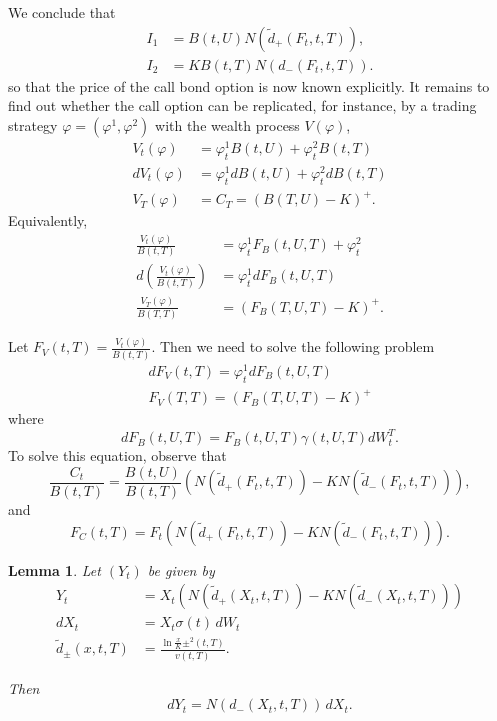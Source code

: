 \documentclass[10pt, oneside, reqno]{amsbook}
\theoremstyle{plain}%
\newtheorem{lem}[thm]{Lemma}
\theoremstyle{definition}
\theoremstyle{remark}
\renewcommand{\phi}{\varphi}
\numberwithin{equation}{chapter}
\begin{document}
    We conclude that \begin{align*}
        I_1 &= B(t, U) N(\tilde d_+(F_t, t, T)), \\
        I_2 &= K B(t, T) N(d_-(F_t, t, T)).
    \end{align*} so that the price of the call bond option is now known explicitly.  It remains to find out whether the call option can be replicated, for instance, by a trading strategy $\phi = (\phi^1, \phi^2)$ with the wealth process $V(\phi)$, \begin{align*}
        V_t(\phi)   &= \phi_t^1 B(t, U) + \phi_t^2 B(t, T) \\
        dV_t(\phi)  &= \phi_t^1 dB(t, U) + \phi^2_t dB(t, T) \\
        V_T(\phi)   &= C_T = (B(T, U) - K)^+.
    \end{align*}  Equivalently,  \begin{align*}
        \frac{V_t(\phi)}{B(t, T)} &= \phi^1_t F_B(t, U, T) + \phi_t^2 \\
        d \left( \frac{V_t(\phi)}{B(t, T)} \right) &= \phi^1_t dF_B(t, U, T) \\
        \frac{V_T(\phi)}{B(T, T)} &= (F_B(T, U, T) - K)^+.  
    \end{align*}

    Let $F_V(t, T) = \frac{V_t(\phi)}{B(t, T)}$.  Then we need to solve the following problem \begin{align*}
        dF_V(t, T) = \phi_t^1 d F_B(t, U, T) \\
        F_V(T, T) = (F_B(T, U, T) - K)^+
    \end{align*} where \[
        dF_B(t, U, T) = F_B(t, U, T) \gamma(t, U, T) dW^T_t.
    \]  To solve this equation, observe that \[
        \frac{C_t}{B(t, T)} = \frac{B(t, U)}{B(t, T)}\left( N( \tilde d_+ (F_t, t, T)) - K N (\tilde d_-(F_t, t, T)) \right),       
    \] and \[
        F_C(t, T) = F_t \left( N( \tilde d_+ (F_t, t, T)) - K N (\tilde d_-(F_t, t, T)) \right).
    \]

\begin{lem}
    Let $(Y_t)$ be given by \begin{align*}
        Y_t &= X_t \left( N( \tilde d_+ (X_t, t, T)) - K N (\tilde d_-(X_t, t, T)) \right) \\
        dX_t &= X_t \sigma(t) \, dW_t \\
        \tilde d_{\pm}(x, t, T) &= \frac{ \ln \frac{x}{K} \pm ^2(t, T)}{v(t, T)}. 
    \end{align*}
    
    Then \[
        dY_t = N(d_{-}(X_t, t, T)) \, dX_t.
    \]
\end{lem}
\end{document}
